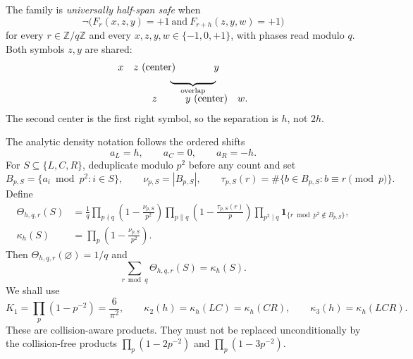 \documentclass[11pt]{article}
\theoremstyle{definition}
\theoremstyle{remark}
\newcommand{\ind}{\mathbf 1}
\newcommand{\T}{\{-1,0,+1\}}
\newcommand{\Z}{\mathbb Z}
\begin{document}
The family is \emph{universally half-span safe} when
\begin{equation}
 \neg\bigl(F_r(x,z,y)=+1\ \text{and}\
 F_{r+h}(z,y,w)=+1\bigr)
 \label{eq:half-span-safety}
\end{equation}
for every \(r\in\Z/q\Z\) and every \(x,z,y,w\in\T\), with phases read
modulo \(q\).  Both symbols \(z,y\) are shared:
\[
\begin{array}{c@{\quad}c@{\quad}c}
 x & z\ (\text{center}) & y\\[-2pt]
   & \multicolumn{2}{c}{\underbrace{\hspace{4.6em}}_{\text{overlap}}}\\[-2pt]
   & z & y\ (\text{center})\quad w .
\end{array}
\]
The second center is the first right symbol, so the separation is \(h\),
not \(2h\).

The analytic density notation follows the ordered shifts
\begin{equation}
 a_L=h,\qquad a_C=0,\qquad a_R=-h.
 \label{eq:coordinate-shifts}
\end{equation}
For \(S\subseteq\{L,C,R\}\), deduplicate modulo \(p^2\) before any
count and set
\begin{equation}
 B_{p,S}=\{a_i\bmod p^2:i\in S\},\qquad
 \nu_{p,S}=|B_{p,S}|,
 \qquad
 \tau_{p,S}(r)=\#\{b\in B_{p,S}:b\equiv r\pmod p\}.
 \label{eq:local-data}
\end{equation}
Define
\begin{align}
 \Theta_{h,q,r}(S)
 &=\frac1q
 \prod_{p\nmid q}\left(1-\frac{\nu_{p,S}}{p^2}\right)
 \prod_{p\parallel q}\left(1-\frac{\tau_{p,S}(r)}p\right)
 \prod_{p^2\mid q}\ind_{\{r\bmod p^2\notin B_{p,S}\}},
 \label{eq:phase-density}\\
 \kappa_h(S)
 &=\prod_p\left(1-\frac{\nu_{p,S}}{p^2}\right).
 \label{eq:kappa-density}
\end{align}
Then \(\Theta_{h,q,r}(\varnothing)=1/q\) and
\begin{equation}
 \sum_{r\bmod q}\Theta_{h,q,r}(S)=\kappa_h(S).
 \label{eq:phase-sum}
\end{equation}
We shall use
\begin{equation}
 K_1=\prod_p(1-p^{-2})=\frac6{\pi^2},\qquad
 \kappa_2(h)=\kappa_h(LC)=\kappa_h(CR),\qquad
 \kappa_3(h)=\kappa_h(LCR).
 \label{eq:kappa23}
\end{equation}
These are collision-aware products.  They must not be replaced
unconditionally by the collision-free products
\(\prod_p(1-2p^{-2})\) and \(\prod_p(1-3p^{-2})\).
\end{document}
